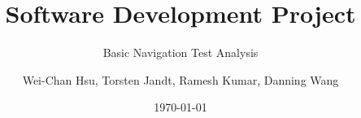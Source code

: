 \documentclass[14pt,aspectratio=1610,xcolor={usenames,dvipsnames,table}]{beamer}
\title{Software Development Project}
\subtitle{Basic Navigation Test Analysis}
\author{Wei-Chan Hsu, Torsten Jandt, Ramesh Kumar, Danning Wang}
\date{\today}
\begin{document}
\begin{frame}
\titlepage
\end{frame}







\end{document}
